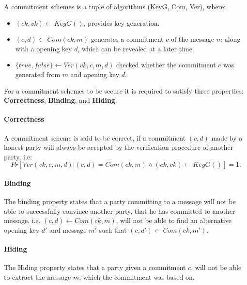 \begin{definition}
A commitment schemes is a tuple of algorithms (KeyG, Com, Ver), where:
\begin{itemize}
  \item $(ck, vk) \leftarrow KeyG()$, provides key generation.
  \item $(c, d) \leftarrow Com(ck, m)$ generates a commitment $c$ of the message
    $m$ along with a opening key $d$, which can be revealed at a later time.
  \item $\{true, false\} \leftarrow Ver(vk, c, m, d)$ checked whether the
    commitment $c$ was generated from $m$ and opening key $d$.
\end{itemize}
\end{definition}

For a commitment schemes to be secure it is required to satisfy three
properties: \textbf{Correctness}, \textbf{Binding}, and \textbf{Hiding}.

\paragraph{Correctness}
A commitment scheme is said to be correct, if a commitment $(c, d)$ made by a
honest party will always be accepted by the verification procedure of another
party, i.e:
$$
Pr[Ver(vk, c, m, d) | (c, d) = Com(ck, m) \land (ck, vk) \leftarrow KeyG()] = 1.
$$

\paragraph{Binding}
The binding property states that a party committing to a message will not be
able to successfully convince another party, that he has committed to another
message, i.e. $(c, d) \leftarrow Com(ck, m)$, will not be able to find an alternative opening key $d'$
and message $m'$ such that $(c, d') \leftarrow Com(ck, m')$.




\paragraph{Hiding}
The Hiding property states that a party given a commitment $c$, will not be able
to extract the message $m$, which the commitment was based on.

